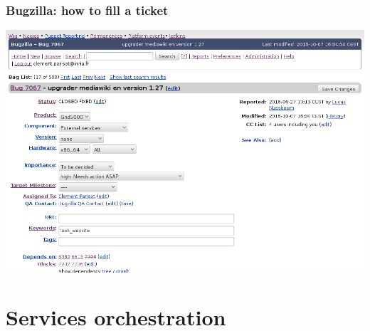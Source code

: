 \documentclass[11pt,compress]{beamer}
\begin{document}
\begin{frame}
\frametitle{Bugzilla: how to fill a ticket}
  \includegraphics[scale=0.29]{figures/bugzilla_ticket}
\end{frame}

\section{Services orchestration}
\end{document}
